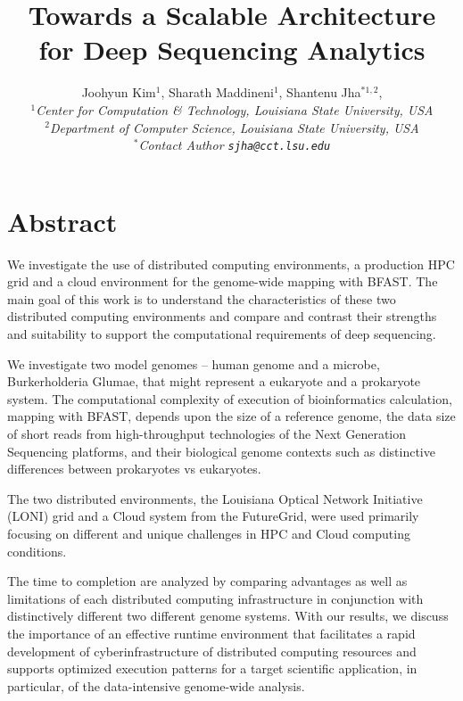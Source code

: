 \documentclass[12pt]{article}
\begin{document}
\title{Towards a Scalable Architecture for Deep Sequencing Analytics}

\author{Joohyun Kim$^{1}$, Sharath Maddineni$^{1}$, Shantenu Jha$^{*1,2}$, \\
  \small{\emph{$^{1}$Center for Computation \& Technology, Louisiana State University, USA}}\\
  \small{\emph{$^{2}$Department of Computer Science, Louisiana State University, USA}}\\
  \small{\emph{$^{*}$Contact Author \texttt{sjha@cct.lsu.edu}}}
  }


\maketitle

\section*{Abstract}

We investigate the use of distributed computing environments, a
production HPC grid and a cloud environment for the genome-wide
mapping with BFAST.  The main goal of this work is to understand the
characteristics of these two distributed computing environments and
compare and contrast their strengths and suitability to support the
computational requirements of deep sequencing.

We investigate two model genomes -- human genome and a microbe,
Burkerholderia Glumae, that might represent a eukaryote and a
prokaryote system.  The computational complexity of execution of bioinformatics calculation, mapping with BFAST, 
depends upon the size of a reference genome, the data size of short
reads from high-throughput technologies of the Next Generation
Sequencing platforms, and their biological genome contexts such as distinctive differences between prokaryotes vs eukaryotes.

The two distributed environments, the Louisiana Optical Network
Initiative (LONI) grid and a Cloud system from the FutureGrid, were
used primarily focusing on different and unique challenges in HPC and
Cloud computing conditions.

The time to completion are analyzed by comparing advantages as well as
limitations of each distributed computing infrastructure in
conjunction with distinctively different two different genome systems.
With our results, we discuss the importance of an effective runtime
environment that facilitates a rapid development of
cyberinfrastructure of distributed computing resources and supports
optimized execution patterns for a target scientific application, in
particular, of the data-intensive genome-wide analysis.
\end{document}
